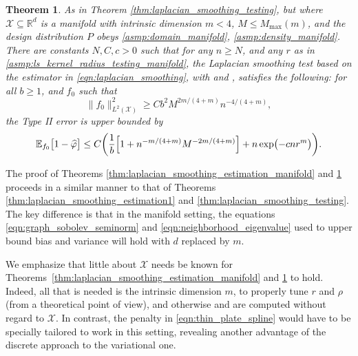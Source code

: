 \documentclass[twoside]{article}
\newcommand{\Reals}{\mathbb{R}}
\newcommand{\1}{\mathbf{1}}
\newcommand{\Rd}{\Reals^d}
\newcommand{\Xset}{\mathcal{X}}
\newcommand{\Leb}{L}
\newcommand{\Ebb}{\mathbb{E}}
\newcommand{\wh}[1]{\widehat{#1}}
\newtheorem{theorem}{Theorem}
\theoremstyle{definition}
\theoremstyle{remark}
\begin{document}
\begin{theorem}
	\label{thm:laplacian_smoothing_testing_manifold}
	As in Theorem \ref{thm:laplacian_smoothing_testing}, but where $\Xset \subseteq \Rd$ is a manifold with intrinsic dimension $m < 4$, $M \leq M_{\max}(m)$, and the design distribution $P$ obeys \ref{asmp:domain_manifold}, \ref{asmp:density_manifold}.
	There are constants $N,C,c>0$ such that for any $n \geq N$, and any $r$ as in \ref{asmp:ls_kernel_radius_testing_manifold}, the Laplacian smoothing test \smash{$\wh{\varphi}$} based on the estimator \smash{$\wh{f}$} in \eqref{eqn:laplacian_smoothing}, with  and , satisfies the following: for all $b \geq 1$, and $f_0$ such that
	\begin{equation}
	\label{eqn:laplacian_smoothing_testing_manifold}
	\bigl\|f_0\bigr\|_{\Leb^2(\Xset)}^2 \geq C b^2 M^{2m/(4 + m)} n^{-4/(4 + m)},
	\end{equation} 
	the Type II error is upper bounded by
	\begin{equation*}
	\Ebb_{f_0}\bigl[1 - \wh{\varphi} \bigr] \leq C\biggl(\frac{1}{b}\Bigl[1 + n^{-m/(4 + m)}M^{-2m/(4 + m)}\Bigr] + n\exp\bigl(-cnr^m\bigr)\biggr).
	\end{equation*}
\end{theorem}

The proof of Theorems \ref{thm:laplacian_smoothing_estimation_manifold} and \ref{thm:laplacian_smoothing_testing_manifold} proceeds in a similar manner to that of Theorems \ref{thm:laplacian_smoothing_estimation1} and \ref{thm:laplacian_smoothing_testing}. The key difference is that in the manifold setting, the equations \eqref{eqn:graph_sobolev_seminorm} and \eqref{eqn:neighborhood_eigenvalue} used to upper bound bias and variance will hold with $d$ replaced by $m$.

We emphasize that little about $\Xset$ needs be known for Theorems~\ref{thm:laplacian_smoothing_estimation_manifold} and \ref{thm:laplacian_smoothing_testing_manifold} to hold. Indeed, all that is needed is the intrinsic dimension $m$, to properly tune $r$ and $\rho$ (from a theoretical point of view), and otherwise \smash{$\wh{f}$} and \smash{$\wh{\varphi}$} are computed without regard to $\Xset$. In contrast, the penalty in \eqref{eqn:thin_plate_spline} would have to be specially tailored to work in this setting, revealing another advantage of the discrete approach to the variational one.
\end{document}
